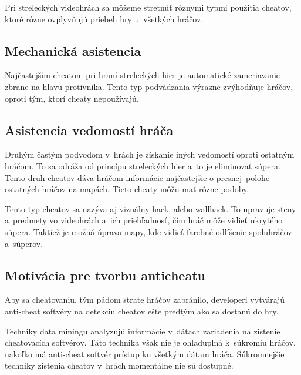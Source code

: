 \documentclass[10pt,twoside,slovak,a4paper]{article}
\begin{document}
Pri streleckých videohrách sa môžeme stretnúť rôznymi typmi použitia
cheatov, ktoré rôzne ovplyvňujú priebeh hry u~všetkých hráčov.

\hypertarget{mechanickuxe1-asistencia}{%
\subsection{Mechanická asistencia}\label{mechanickuxe1-asistencia}}

Najčastejším cheatom pri hraní streleckých hier je automatické
zameriavanie zbrane na hlavu protivníka. Tento typ podvádzania výrazne
zvýhodňuje hráčov, oproti tým, ktorí cheaty nepoužívajú.\cite{aim}

\hypertarget{asistencia-vedomostuxed-hruxe1ux10da}{%
\subsection{Asistencia vedomostí
hráča}\label{asistencia-vedomostuxed-hruxe1ux10da}}

Druhým častým podvodom v~hrách je získanie iných vedomostí oproti
ostatným hráčom. To sa odráža od princípu streleckých hier a~to je
eliminovať súpera. Tento druh cheatov dáva hráčom informácie
najčastejšie o presnej~polohe ostatných hráčov na mapách. Tieto cheaty
môžu mať rôzne podoby. 

Tento typ cheatov sa nazýva aj vizuálny hack,
alebo wallhack. To upravuje steny a~predmety vo videohrách a~ich
priehľadnosť, čím hráč môže vidieť ukrytého súpera. Taktiež je možná
úprava mapy, kde vidieť farebné odlíšenie spoluhráčov a~súperov.\cite{wallhack}

\hypertarget{asistencia-vedomostuxed-hruxe1ux10da}{%
\subsection{Motivácia pre tvorbu anticheatu}\label{asistencia-vedomostuxed-hruxe1ux10da}}
Aby sa cheatovaniu, tým pádom strate hráčov zabránilo, developeri
vytvárajú anti-cheat softvéry na detekciu cheatov ešte predtým ako sa
dostanú do hry.

Techniky data miningu analyzujú informácie v~dátach zariadenia na
zistenie cheatovacích softvérov. Táto technika však nie je ohľaduplná
k~súkromiu hráčov, nakoľko má anti-cheat softvér prístup ku všetkým
dátam hráča. Súkromnejšie techniky zistenia cheatov v~hrách momentálne
nie sú dostupné.





\end{document}
